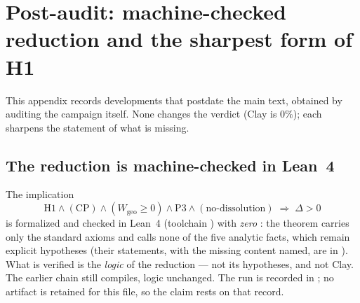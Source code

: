 \clearpage
\appendix
\section{Post-audit: machine-checked reduction and the sharpest form of H1}
\label{app:postaudit}

This appendix records developments that postdate the main text, obtained by
auditing the campaign itself. None changes the verdict (Clay is $0\%$); each
sharpens the statement of what is missing.

\subsection{The reduction is machine-checked in Lean~4}
\LT{} The implication
\[
  \mathrm{H1}\wedge(\mathrm{CP})\wedge(W_{\mathrm{geo}}\!\ge0)\wedge\mathrm{P3}\wedge(\text{no-dissolution})
  \;\Longrightarrow\;\Delta>0
\]
is formalized and checked in Lean~4 (toolchain ) with
\emph{zero} : the theorem  carries only
the standard axioms  and calls none
of the five analytic facts, which remain explicit  hypotheses (their
statements, with the missing content named, are in ).
What is verified is the \emph{logic} of the reduction --- not its hypotheses, and
not Clay. The earlier chain  still
compiles, logic unchanged. The run is recorded in ; no
 artifact is retained for this file, so the claim rests on that record.

